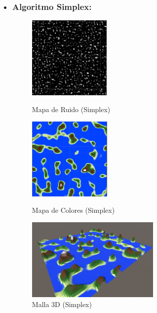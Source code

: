 \begin{itemize}
    
    \item \subsubsection{Algoritmo Simplex:}
    
    \begin{figure}[htbp]
        \begin{minipage}[t]{0.3\linewidth}
            \centering
            \includegraphics[width=\textwidth, height=4cm]{img/codes/Simplex123.png}
            \caption{Mapa de Ruido (Simplex)}
        \end{minipage}%
        \hfill
        \begin{minipage}[t]{0.3\linewidth}
            \centering
            \includegraphics[width=\textwidth, height=4cm]{img/codes/SimplexColors.png}
            \caption{Mapa de Colores (Simplex)}
        \end{minipage}%
        \hfill
        \begin{minipage}[t]{0.3\linewidth}
            \centering
            \includegraphics[width=\textwidth, height=4cm]{img/codes/Simples3D.png}
            \caption{Malla 3D (Simplex)}
        \end{minipage}
        

\end{figure}
\end{itemize}
